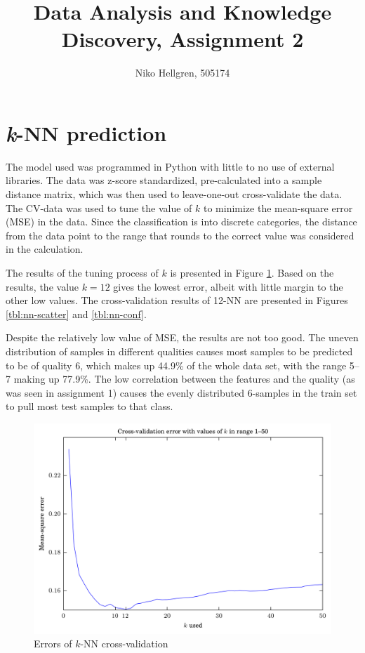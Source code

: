 \documentclass[notitlepage]{report}
\author{Niko Hellgren, 505174}
\title{Data Analysis and Knowledge Discovery, Assignment 2}
\begin{document}
\maketitle

\section{\textit{k}-NN prediction}
The model used was programmed in Python with little to no use of external libraries. The data was z-score standardized, pre-calculated into a sample distance matrix, which was then used to leave-one-out cross-validate the data. The CV-data was used to tune the value of $k$ to minimize the mean-square error (MSE) in the data. Since the classification is into discrete categories, the distance from the data point to the range that rounds to the correct value was considered in the calculation.

The results of the tuning process of $k$ is presented in Figure \ref{tbl:nn-mses}. Based on the results, the value $k=12$ gives the lowest error, albeit with little margin to the other low values. The cross-validation results of 12-NN are presented in Figures \ref{tbl:nn-scatter} and \ref{tbl:nn-conf}.

Despite the relatively low value of MSE, the results are not too good. The uneven distribution of samples in different qualities causes most samples to be predicted to be of quality 6, which makes up 44.9\% of the whole data set, with the range 5--7 making up 77.9\%. The low correlation between the features and the quality (as was seen in assignment 1) causes the evenly distributed 6-samples in the train set to pull most test samples to that class.

\begin{figure}[H]
\includegraphics[width=\textwidth]{mse2_k1-50.png}
\caption{Errors of $k$-NN cross-validation}
\label{tbl:nn-mses}
\end{figure}
\end{document}
